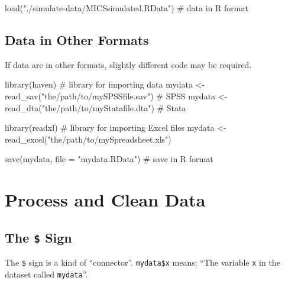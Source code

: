 \documentclass[
  letterpaper,
  DIV=11,
  numbers=noendperiod]{scrreprt}
\newenvironment{Shaded}{\begin{snugshade}}{\end{snugshade}}
\newcommand{\AttributeTok}[1]{\textcolor[rgb]{0.40,0.45,0.13}{#1}}
\newcommand{\CommentTok}[1]{\textcolor[rgb]{0.37,0.37,0.37}{#1}}
\newcommand{\FunctionTok}[1]{\textcolor[rgb]{0.28,0.35,0.67}{#1}}
\newcommand{\NormalTok}[1]{\textcolor[rgb]{0.00,0.23,0.31}{#1}}
\newcommand{\OtherTok}[1]{\textcolor[rgb]{0.00,0.23,0.31}{#1}}
\newcommand{\StringTok}[1]{\textcolor[rgb]{0.13,0.47,0.30}{#1}}
\begin{document}
\begin{Shaded}
\begin{Highlighting}[]
\FunctionTok{load}\NormalTok{(}\StringTok{"./simulate{-}data/MICSsimulated.RData"}\NormalTok{) }\CommentTok{\# data in R format}
\end{Highlighting}
\end{Shaded}

\hypertarget{data-in-other-formats}{%
\subsection{Data in Other Formats}\label{data-in-other-formats}}

If data are in other formats, slightly different code may be required.

\begin{Shaded}
\begin{Highlighting}[]
\FunctionTok{library}\NormalTok{(haven) }\CommentTok{\# library for importing data }
\NormalTok{mydata }\OtherTok{\textless{}{-}} \FunctionTok{read\_sav}\NormalTok{(}\StringTok{"the/path/to/mySPSSfile.sav"}\NormalTok{) }\CommentTok{\# SPSS}
\NormalTok{mydata }\OtherTok{\textless{}{-}} \FunctionTok{read\_dta}\NormalTok{(}\StringTok{"the/path/to/myStatafile.dta"}\NormalTok{) }\CommentTok{\# Stata}

\FunctionTok{library}\NormalTok{(readxl) }\CommentTok{\# library for importing Excel files}
\NormalTok{mydata }\OtherTok{\textless{}{-}} \FunctionTok{read\_excel}\NormalTok{(}\StringTok{"the/path/to/mySpreadsheet.xls"}\NormalTok{)}

\FunctionTok{save}\NormalTok{(mydata, }\AttributeTok{file =} \StringTok{"mydata.RData"}\NormalTok{) }\CommentTok{\# save in R format}
\end{Highlighting}
\end{Shaded}

\hypertarget{process-and-clean-data}{%
\section{Process and Clean Data}\label{process-and-clean-data}}

\hypertarget{the-sign}{%
\subsection{\texorpdfstring{The \texttt{\$}
Sign}{The \$ Sign}}\label{the-sign}}

The \texttt{\$} sign is a kind of ``connector''. \texttt{mydata\$x}
means: ``The variable \texttt{x} in the dataset called
\texttt{mydata}''.
\end{document}
